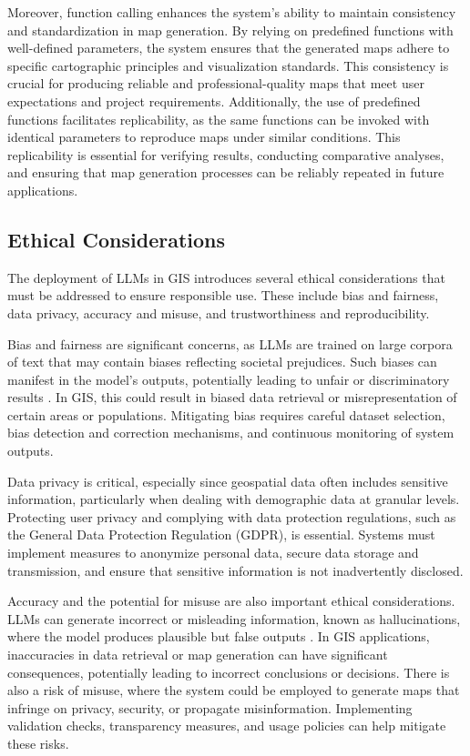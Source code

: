Moreover, function calling enhances the system's ability to maintain consistency and standardization in map generation. By relying on predefined functions with well-defined parameters, the system ensures that the generated maps adhere to specific cartographic principles and visualization standards. This consistency is crucial for producing reliable and professional-quality maps that meet user expectations and project requirements. Additionally, the use of predefined functions facilitates replicability, as the same functions can be invoked with identical parameters to reproduce maps under similar conditions. This replicability is essential for verifying results, conducting comparative analyses, and ensuring that map generation processes can be reliably repeated in future applications.

\subsection{Ethical Considerations}

The deployment of LLMs in GIS introduces several ethical considerations that must be addressed to ensure responsible use. These include bias and fairness, data privacy, accuracy and misuse, and trustworthiness and reproducibility.

Bias and fairness are significant concerns, as LLMs are trained on large corpora of text that may contain biases reflecting societal prejudices. Such biases can manifest in the model's outputs, potentially leading to unfair or discriminatory results \cite{wang_aligning_2023, gallegos_bias_2024}. In GIS, this could result in biased data retrieval or misrepresentation of certain areas or populations. Mitigating bias requires careful dataset selection, bias detection and correction mechanisms, and continuous monitoring of system outputs.

Data privacy is critical, especially since geospatial data often includes sensitive information, particularly when dealing with demographic data at granular levels. Protecting user privacy and complying with data protection regulations, such as the General Data Protection Regulation (GDPR), is essential. Systems must implement measures to anonymize personal data, secure data storage and transmission, and ensure that sensitive information is not inadvertently disclosed.

Accuracy and the potential for misuse are also important ethical considerations. LLMs can generate incorrect or misleading information, known as hallucinations, where the model produces plausible but false outputs \cite{shuster_retrieval_2021}. In GIS applications, inaccuracies in data retrieval or map generation can have significant consequences, potentially leading to incorrect conclusions or decisions. There is also a risk of misuse, where the system could be employed to generate maps that infringe on privacy, security, or propagate misinformation. Implementing validation checks, transparency measures, and usage policies can help mitigate these risks.

